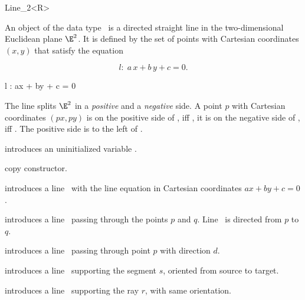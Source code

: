 \begin{ccRefClass} {Line_2<R>}

\ccDefinition
An object  of the data type \ccRefName\ is a directed
straight line in the two-dimensional Euclidean plane $\E^2$. It is
defined by the set of points with Cartesian coordinates $(x,y)$ 
that satisfy the equation 
\begin{ccTexOnly}
\[ l:\; a\, x +b\, y +c = 0. \]
\end{ccTexOnly}
\begin{ccHtmlOnly}
 l : ax + by + c = 0 
\end{ccHtmlOnly}
 
The line splits $\E^2$ in a {\em positive} and a {\em negative}
side. A point $p$ with Cartesian coordinates 
$(px, py)$ is on the positive side of , iff
, it is
on the negative side of , iff 
.
The positive side is to the left of .

\ccCreation
{}

\ccHidden {}
             {introduces an uninitialized variable \ccVar.}

\ccHidden {}
 	    {copy constructor.}

            {introduces a line \ccVar\ with the line equation in Cartesian
	      coordinates $ax +by +c = 0$.}

            {introduces a line \ccVar\ passing through the points $p$ and $q$. 
             Line \ccVar\ is directed from $p$ to $q$.}

            {introduces a line \ccVar\ passing through point $p$ with 
             direction $d$.}

            {introduces a line \ccVar\ supporting the segment $s$,
	    oriented from source to target.}

            {introduces a line \ccVar\ supporting the ray $r$,
	    with same orientation.}

\ccOperations



\end{ccRefClass}
